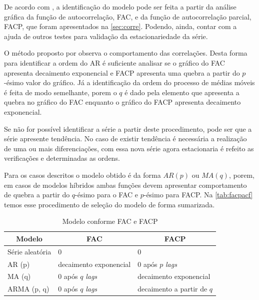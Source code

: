 \documentclass[
    12pt,
    oneside,
    a4paper,
    english,
    brazil
]{abntex2}
\begin{document}
De acordo  com ,  a identificação  do modelo  pode ser  feita a
partir da  análise gráfica  da função  de autocorrelação, FAC,  e da  função de
autocorrelação parcial,  FACP, que  foram apresentados  na \autoref{sec:corre}.
Podendo,  ainda,  contar  com  a  ajuda de  outros  testes  para  validação  da
estacionariedade da série.

O método proposto por  observa o comportamento das correlações.
Desta forma para identificar  a ordem do AR é suficiente  analisar se o gráfico
do FAC apresenta decaimento exponencial e FACP apresenta uma quebra a partir do
$p$-ésimo valor do  gráfico. Já a identificação da ordem  do processo de médias
móveis  é feita  de modo  semelhante,  porem o  $q$  é dado  pela elemento  que
apresenta  a quebra  no gráfico  do FAC  enquanto o  gráfico do  FACP apresenta
decaimento exponencial.

Se não for  possível identificar a série a partir  deste procedimento, pode ser
que a  série apresente  tendência. No  caso de  existir tendência  é necessária
a  realização  de  uma  ou  mais diferenciações,  com  essa  nova  série  agora
estacionaria é refeito as verificações e determinadas as ordens.


Para os casos descritos  o modelo obtido é da forma  $AR(p)$ ou $MA(q)$, porem,
em casos  de modelos híbridos  ambas funções devem apresentar  comportamento de
quebra  a  partir  do  $q$-ésimo  para  o  FAC  e  $p$-ésimo  para  FACP\@.  Na
\autoref{tab:facpacf} temos  esse procedimento  de seleção  do modelo  de forma
sumarizada.

\begin{table}[ht]
    \centering
    \caption{Modelo conforme FAC e FACP}\label{tab:facpacf}
    \begin{tabular}{l l l}
        \multicolumn{1}{c}{Modelo} & \multicolumn{1}{c}{FAC} & \multicolumn{1}{c}{FACP} \\
        \toprule
        Série aleatória  & 0                           & 0                        \\
        AR (p)           & decaimento exponencial      & 0 após $p$ \textit{lags} \\
        MA (q)           & 0 após $q$ \textit{lags}    & decaimento exponencial   \\
        ARMA (p, q)      & 0 após $q$ \textit{lags}    & decaimento a partir de $q$
    \end{tabular}
\end{table}
\end{document}
